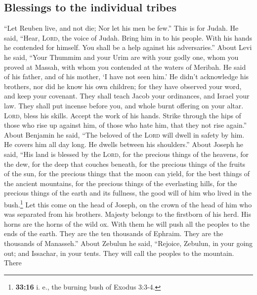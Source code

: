 \hypertarget{blessings-to-the-individual-tribes}{%
\subsection{Blessings to the individual
tribes}\label{blessings-to-the-individual-tribes}}

 ``Let Reuben live, and not die; Nor let his men be few.''
 This is for Judah. He said, ``Hear, \textsc{Lord}, the
voice of Judah. Bring him in to his people. With his hands he contended
for himself. You shall be a help against his adversaries.''
 About Levi he said, ``Your Thummim and your Urim are with
your godly one, whom you proved at Massah, with whom you contended at
the waters of Meribah.  He said of his father, and of his
mother, `I have not seen him.' He didn't acknowledge his brothers, nor
did he know his own children; for they have observed your word, and keep
your covenant.  They shall teach Jacob your ordinances,
and Israel your law. They shall put incense before you, and whole burnt
offering on your altar.  \textsc{Lord}, bless his skills.
Accept the work of his hands. Strike through the hips of those who rise
up against him, of those who hate him, that they not rise again.''
 About Benjamin he said, ``The beloved of the
\textsc{Lord} will dwell in safety by him. He covers him all day long.
He dwells between his shoulders.''  About Joseph he said,
``His land is blessed by the \textsc{Lord}, for the precious things of
the heavens, for the dew, for the deep that couches beneath,
 for the precious things of the fruits of the sun, for
the precious things that the moon can yield,  for the
best things of the ancient mountains, for the precious things of the
everlasting hills,  for the precious things of the earth
and its fullness, the good will of him who lived in the bush.\footnote{\textbf{33:16}
  i. e., the burning bush of Exodus 3:3-4.} Let this come on the head of
Joseph, on the crown of the head of him who was separated from his
brothers.  Majesty belongs to the firstborn of his herd.
His horns are the horns of the wild ox. With them he will push all the
peoples to the ends of the earth. They are the ten thousands of Ephraim.
They are the thousands of Manasseh.''  About Zebulun he
said, ``Rejoice, Zebulun, in your going out; and Issachar, in your
tents.  They will call the peoples to the mountain. There
